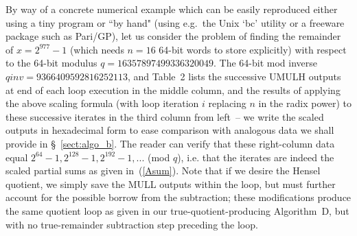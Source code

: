 \documentclass{article}
\begin{document}
By way of a concrete numerical example which can be easily reproduced either using a tiny program or ``by hand" (using e.g.~the Unix `bc' utility or a freeware package such as Pari/GP), let us consider the problem of finding the remainder of $x = 2^{977}-1$ (which needs $n = 16$ 64-bit words to store explicitly) with respect to the 64-bit modulus $q = 16357897499336320049$. The 64-bit mod inverse $qinv = 9366409592816252113$, and Table~2 lists the successive UMULH outputs at end of each loop execution in the middle column, and the results of applying the above scaling formula (with loop iteration $i$ replacing $n$ in the radix power) to these successive iterates in the third column from left~-- we write the scaled outputs in hexadecimal form to ease comparison with analogous data we shall provide in \S~\ref{sect:algo_b}. The reader can verify that these right-column data equal $2^{64}-1, 2^{128}-1, 2^{192}-1, ...$ (mod $q$), i.e. that the iterates are indeed the scaled partial sums as given in~(\ref{Asum}). Note that if we desire the Hensel quotient, we simply save the MULL outputs within the loop, but must further account for the possible borrow from the subtraction; these modifications produce the same quotient loop as given in our true-quotient-producing Algorithm~D, but with no true-remainder subtraction step preceding the loop.
\end{document}

